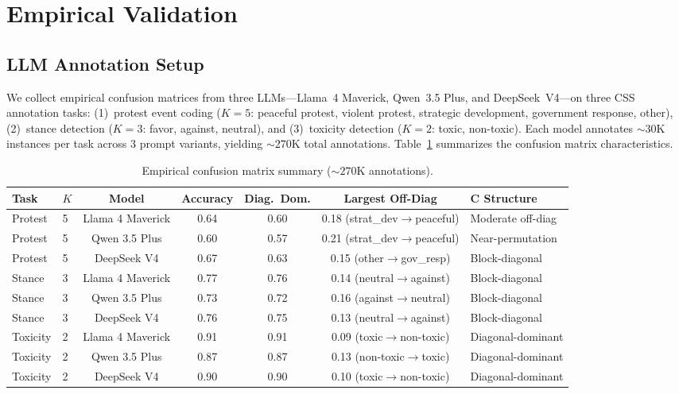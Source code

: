 \documentclass[11pt]{article}
\newcommand{\bC}{\mathbf{C}}
\begin{document}
\section{Empirical Validation}
\label{sec:empirical}

\subsection{LLM Annotation Setup}

We collect empirical confusion matrices from three LLMs---Llama~4 Maverick, Qwen~3.5 Plus, and DeepSeek~V4---on three CSS annotation tasks:
(1)~protest event coding ($K\!=\!5$: peaceful protest, violent protest, strategic development, government response, other),
(2)~stance detection ($K\!=\!3$: favor, against, neutral), and
(3)~toxicity detection ($K\!=\!2$: toxic, non-toxic).
Each model annotates ${\sim}30$K instances per task across 3 prompt variants, yielding ${\sim}270$K total annotations.
Table~\ref{tab:empirical-C} summarizes the confusion matrix characteristics.

\begin{table}[t]
\centering
\caption{Empirical confusion matrix summary (${\sim}270$K annotations).}
\label{tab:empirical-C}
\small
\begin{adjustbox}{max width=\textwidth}
\begin{tabular}{llccccl}
\toprule
Task & $K$ & Model & Accuracy & Diag.~Dom. & Largest Off-Diag & $\bC$ Structure \\
\midrule
Protest & 5 & Llama 4 Maverick & 0.64 & 0.60 & 0.18 (strat\_dev$\to$peaceful) & Moderate off-diag \\
Protest & 5 & Qwen 3.5 Plus    & 0.60 & 0.57 & 0.21 (strat\_dev$\to$peaceful) & Near-permutation \\
Protest & 5 & DeepSeek V4       & 0.67 & 0.63 & 0.15 (other$\to$gov\_resp)     & Block-diagonal \\
Stance  & 3 & Llama 4 Maverick & 0.77 & 0.76 & 0.14 (neutral$\to$against) & Block-diagonal \\
Stance  & 3 & Qwen 3.5 Plus    & 0.73 & 0.72 & 0.16 (against$\to$neutral) & Block-diagonal \\
Stance  & 3 & DeepSeek V4       & 0.76 & 0.75 & 0.13 (neutral$\to$against) & Block-diagonal \\
Toxicity& 2 & Llama 4 Maverick & 0.91 & 0.91 & 0.09 (toxic$\to$non-toxic) & Diagonal-dominant \\
Toxicity& 2 & Qwen 3.5 Plus    & 0.87 & 0.87 & 0.13 (non-toxic$\to$toxic) & Diagonal-dominant \\
Toxicity& 2 & DeepSeek V4       & 0.90 & 0.90 & 0.10 (toxic$\to$non-toxic) & Diagonal-dominant \\
\bottomrule
\end{tabular}
\end{adjustbox}
\end{table}
\end{document}

